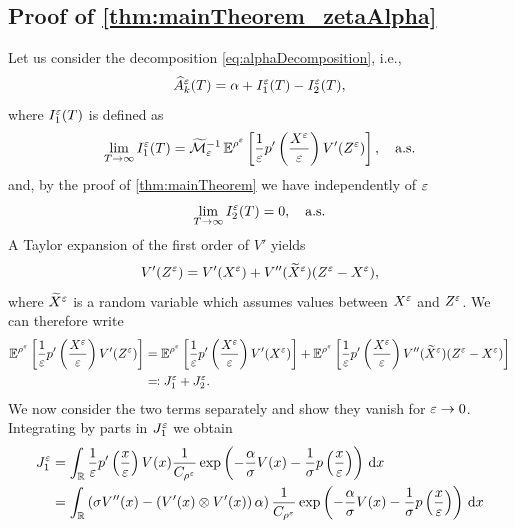 \documentclass[review,onefignum,onetabnum]{siamonline190516}
\begin{document}
\begin{appendices}
\subsection{Proof of \cref{thm:mainTheorem_zetaAlpha}}
	Let us consider the decomposition \eqref{eq:alphaDecomposition}, i.e.,
	\begin{equation}
	\widehat A_k^\varepsilon(T) = \alpha + I_1^\varepsilon(T) - I_2^\varepsilon(T),
	\end{equation}
	where $I_1^\varepsilon(T)$ is defined as
	\begin{equation}
		\lim_{T \to \infty} I_1^\varepsilon(T) = \widetilde {\mathcal M}_\varepsilon^{-1} \operatorname{\mathbb{E}}^{\rho^\varepsilon} \left [ \frac{1}{\varepsilon} p' \left ( \frac{X^\varepsilon}{\varepsilon} \right ) V'(Z^\varepsilon) \right ], \quad \text{a.s.}
	\end{equation}
	and, by the proof of \cref{thm:mainTheorem} we have independently of $\varepsilon$
	\begin{equation}
		\lim_{T \to \infty} I_2^\varepsilon(T) = 0, \quad \text{a.s.}
	\end{equation}
	A Taylor expansion of the first order of $V'$ yields
	\begin{equation}
	V'(Z^\varepsilon) = V'(X^\varepsilon) + V''(\widetilde X^\varepsilon) (Z^\varepsilon - X^\varepsilon),
	\end{equation}
	where $\widetilde X^\varepsilon$ is a random variable which assumes values between $X^\varepsilon$ and $Z^\varepsilon$. We can therefore write
	\begin{equation}
	\begin{aligned}
	\operatorname{\mathbb{E}}^{\rho^\varepsilon} \left [ \frac{1}{\varepsilon} p' \left ( \frac{X^\varepsilon}{\varepsilon} \right ) V'(Z^\varepsilon) \right ] &= \operatorname{\mathbb{E}}^{\rho^\varepsilon} \left [ \frac{1}{\varepsilon} p' \left ( \frac{X^\varepsilon}{\varepsilon} \right ) V'(X^\varepsilon) \right ] + \operatorname{\mathbb{E}}^{\rho^\varepsilon} \left [ \frac{1}{\varepsilon} p' \left ( \frac{X^\varepsilon}{\varepsilon} \right ) V''(\widetilde X^\varepsilon) (Z^\varepsilon - X^\varepsilon) \right ] \\
	&\eqqcolon J_1^\varepsilon + J_2^\varepsilon.
	\end{aligned}
	\end{equation}
	We now consider the two terms separately and show they vanish for $\varepsilon \to 0$. Integrating by parts in $J_1^\varepsilon$ we obtain
	\begin{equation}
	\begin{aligned}
	J_1^\epl &= \int_\R \frac{1}{\epl} p' \left( \frac{x}{\epl} \right) V(x) \frac{1}{C_{\rho^\epl}} \exp \left( -\frac\alpha\sigma V(x) - \frac1\sigma p\left(\frac{x}{\epl}\right) \right) \dd x \\
	&= \int_\R \left ( \sigma V''(x) -  \left(V'(x) \otimes V'(x)\right) \alpha \right) \frac{1}{C_{\rho^\epl}} \exp \left( -\frac\alpha\sigma V(x) - \frac1\sigma p\left(\frac{x}{\epl}\right) \right) \dd x \\

\end{aligned}
\end{equation}
\end{appendices}
\end{document}
